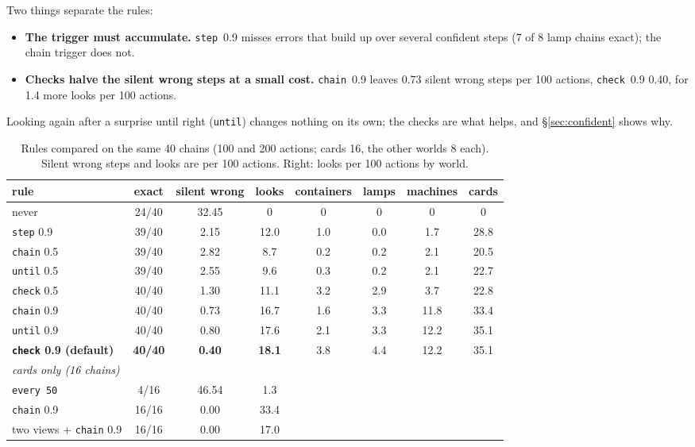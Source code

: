 \documentclass[11pt]{article}
\begin{document}
Two things separate the rules:
\begin{itemize}
  \item \textbf{The trigger must accumulate.} \texttt{step}~0.9 misses errors that build up over several confident
  steps (7 of 8 lamp chains exact); the chain trigger does not.
  \item \textbf{Checks halve the silent wrong steps at a small cost.} \texttt{chain}~0.9 leaves 0.73 silent wrong steps
  per 100 actions, \texttt{check}~0.9 0.40, for 1.4 more looks per 100 actions.
\end{itemize}
Looking again after a surprise until right (\texttt{until}) changes nothing on its own; the checks are what helps, and
\S\ref{sec:confident} shows why.

\begin{table}[t]\centering\small
\caption{Rules compared on the same 40 chains (100 and 200 actions; cards 16, the other worlds 8 each). Silent wrong
steps and looks are per 100 actions. Right: looks per 100 actions by world.}
\label{tab:rules}
\begin{tabular}{lccc|cccc}
\toprule
rule & exact & silent wrong & looks & containers & lamps & machines & cards \\
\midrule
never & 24/40 & 32.45 & 0 & 0 & 0 & 0 & 0 \\
\texttt{step} 0.9 & 39/40 & 2.15 & 12.0 & 1.0 & 0.0 & 1.7 & 28.8 \\
\texttt{chain} 0.5 & 39/40 & 2.82 & 8.7 & 0.2 & 0.2 & 2.1 & 20.5 \\
\texttt{until} 0.5 & 39/40 & 2.55 & 9.6 & 0.3 & 0.2 & 2.1 & 22.7 \\
\texttt{check} 0.5 & 40/40 & 1.30 & 11.1 & 3.2 & 2.9 & 3.7 & 22.8 \\
\texttt{chain} 0.9 & 40/40 & 0.73 & 16.7 & 1.6 & 3.3 & 11.8 & 33.4 \\
\texttt{until} 0.9 & 40/40 & 0.80 & 17.6 & 2.1 & 3.3 & 12.2 & 35.1 \\
\textbf{\texttt{check} 0.9 (default)} & \textbf{40/40} & \textbf{0.40} & \textbf{18.1} & 3.8 & 4.4 & 12.2 & 35.1 \\
\midrule
\multicolumn{8}{l}{\emph{cards only (16 chains)}} \\
\texttt{every 50} & 4/16 & 46.54 & 1.3 & & & & \\
\texttt{chain} 0.9 & 16/16 & 0.00 & 33.4 & & & & \\
two views + \texttt{chain} 0.9 & 16/16 & 0.00 & 17.0 & & & & \\
\bottomrule
\end{tabular}
\end{table}
\end{document}
